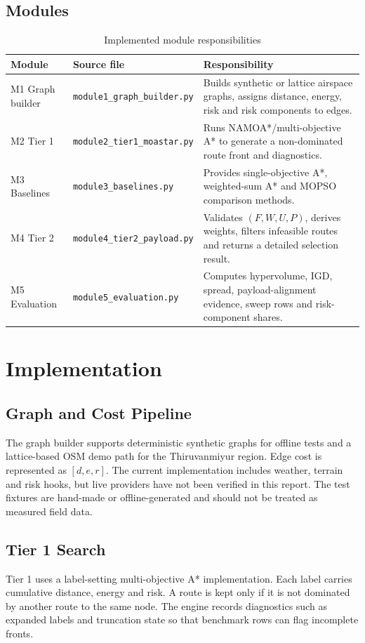 \documentclass{ssnreview}
\newcommand{\tagtuple}{(F,W,U,P)}
\begin{document}
\section{Modules}
\begin{table}[H]
\centering
\caption{Implemented module responsibilities}
\label{tab:modules}
\begin{tabularx}{\textwidth}{p{}p{}X}
\toprule
\textbf{Module} & \textbf{Source file} & \textbf{Responsibility} \\
\midrule
M1 Graph builder & \texttt{module1\_graph\_builder.py} &
Builds synthetic or lattice airspace graphs, assigns distance, energy, risk and risk components to edges. \\
\addlinespace
M2 Tier 1 & \texttt{module2\_tier1\_moastar.py} &
Runs NAMOA*/multi-objective A* to generate a non-dominated route front and diagnostics. \\
\addlinespace
M3 Baselines & \texttt{module3\_baselines.py} &
Provides single-objective A*, weighted-sum A* and MOPSO comparison methods. \\
\addlinespace
M4 Tier 2 & \texttt{module4\_tier2\_payload.py} &
Validates \(\tagtuple\), derives weights, filters infeasible routes and returns a detailed selection result. \\
\addlinespace
M5 Evaluation & \texttt{module5\_evaluation.py} &
Computes hypervolume, IGD, spread, payload-alignment evidence, sweep rows and risk-component shares. \\
\bottomrule
\end{tabularx}
\end{table}

\chapter{Implementation}
\section{Graph and Cost Pipeline}
The graph builder supports deterministic synthetic graphs for offline tests and a lattice-based OSM demo path for
the Thiruvanmiyur region. Edge cost is represented as \([d,e,r]\). The current implementation includes weather,
terrain and risk hooks, but live providers have not been verified in this report. The test fixtures are hand-made or
offline-generated and should not be treated as measured field data.

\section{Tier 1 Search}
Tier 1 uses a label-setting multi-objective A* implementation. Each label carries cumulative distance, energy and
risk. A route is kept only if it is not dominated by another route to the same node. The engine records diagnostics
such as expanded labels and truncation state so that benchmark rows can flag incomplete fronts.
\end{document}
